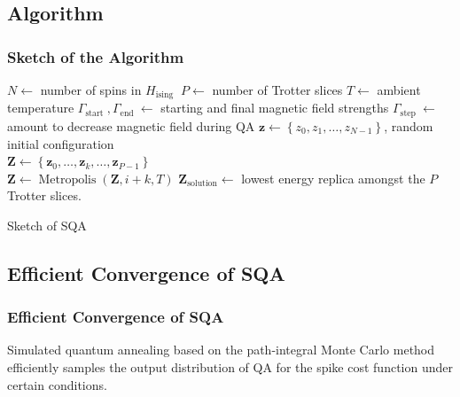 \documentclass[11pt,compress,mathserif]{beamer}
\begin{document}
\subsection{Algorithm}
\begin{frame}\frametitle{Sketch of the Algorithm}
\begin{algorithm}[H]
\scriptsize
\begin{algorithmic}[1]
\STATE $N \leftarrow$ number of spins in $H_{\text {ising }}$
\STATE $P \leftarrow$ number of Trotter slices
\STATE $T \leftarrow$ ambient temperature 
\STATE $\Gamma_{\text {start }}, \Gamma_{\text {end }} \leftarrow$ starting and final magnetic field strengths
\STATE $\Gamma_{\text {step }} \leftarrow$ amount to decrease magnetic field during QA
\STATE $\mathbf{z} \leftarrow\left\{z_{0}, z_{1}, \ldots, z_{N-1}\right\}$, random initial configuration 
\\[5pt]
\STATE $\mathbf{Z} \leftarrow\left\{\mathbf{z}_{0}, \ldots, \mathbf{z}_{k}, \ldots, \mathbf{z}_{P-1}\right\}$
\\[5pt]
\STATE $\mathbf{Z} \leftarrow \operatorname{Metropolis}(\mathbf{Z}, i+k, T)$
\ENDFOR
\ENDFOR
\STATE $\mathbf{Z}_{\text{solution}} \leftarrow$ lowest energy replica amongst the $P$ Trotter slices.
\end{algorithmic}
\caption{Sketch of SQA}
\label{alg:sqa}
\end{algorithm}
\end{frame}

\subsection[Efficiency]{Efficient Convergence of SQA}
\begin{frame}\frametitle{Efficient Convergence of SQA}


\begin{theorem}
Simulated quantum annealing based on the path-integral Monte Carlo method efficiently samples the output distribution of QA for the spike cost function under certain conditions.
\end{theorem}

\end{frame}
\end{document}
